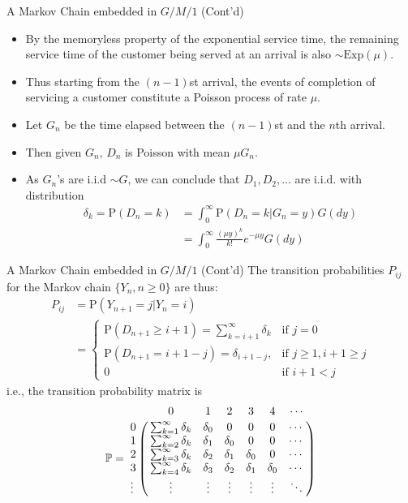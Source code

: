 \documentclass[letterpaper,handout]{beamer}
\def\P{\mathbb{P}}
\def\p{\mathrm P}
\begin{document}
\begin{frame}{A Markov Chain embedded in $G/M/1$ (Cont'd)}
\begin{itemize}
\item By the memoryless property of the exponential service time,
the remaining service time of the customer being served at an arrival is also $\sim\mbox{Exp}(\mu).$

\item Thus starting from the $(n-1)$st arrival, the events of completion of servicing a customer constitute a Poisson process of rate $\mu$.
\item Let $G_n$ be the time elapsed between the $(n-1)$st and the $n$th arrival.
\item Then given $G_n$, $D_n$ is Poisson with mean $\mu G_n$.
\item As $G_n$'s are i.i.d $\sim G$, we can conclude that $D_1,D_2,\ldots$ are i.i.d. with distribution
\begin{align*}
\delta_k = \p(D_n=k)&=\int_0^{\infty} \p(D_n=k|G_n=y)G(dy)\\
&=\int_0^{\infty} \frac{(\mu y)^k}{k!}e^{-\mu y}G(dy)
\end{align*}
\end{itemize}
\end{frame}
\begin{frame}{A Markov Chain embedded in $G/M/1$ (Cont'd)}
The transition probabilities $P_{ij}$ for the Markov chain $\{Y_n, n\ge 0\}$ are thus:
\begin{align*}
P_{ij} &= \p(Y_{n+1}=j|Y_n=i)\\
&=
\begin{cases}
\p(D_{n+1}\ge i+1)=\sum_{k=i+1}^{\infty}\delta_k  & \mbox{if }j=0\\
\p(D_{n+1}=i+1-j)=\delta_{i+1-j}, & \mbox{if }j\ge 1, i+1 \ge j\\
0 &\mbox{if }i+1<j
\end{cases}
\end{align*}
i.e., the transition probability matrix is
$$\P=
\bordermatrix{%
   &  0  &  1  &  2  &  3  &  4  &\cdots\cr
0  & \sum_{k=1}^{\infty}\delta_k & \delta_0 &  0  &  0  &  0  &\cdots \cr
1  & \sum_{k=2}^{\infty}\delta_k & \delta_1 & \delta_0 &  0  &  0  &\cdots \cr
2  & \sum_{k=3}^{\infty}\delta_k & \delta_2 & \delta_1 & \delta_0 &  0  &\cdots \cr
3  & \sum_{k=4}^{\infty}\delta_k & \delta_3 & \delta_2 & \delta_1 & \delta_0 &\cdots \cr
\vdots&\vdots&\vdots&\vdots&\vdots&\vdots& \ddots
}
$$
\end{frame}
\end{document}
